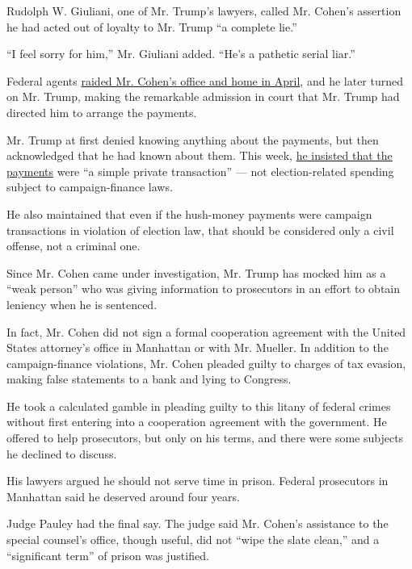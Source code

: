 Rudolph W. Giuliani, one of Mr. Trump's lawyers, called Mr. Cohen's
assertion he had acted out of loyalty to Mr. Trump ``a complete lie.''

``I feel sorry for him,'' Mr. Giuliani added. ``He's a pathetic serial
liar.''

Federal agents
\href{https://www.nytimes.com/2018/04/09/us/politics/fbi-raids-office-of-trumps-longtime-lawyer-michael-cohen.html}{raided
Mr. Cohen's office and home in April}, and he later turned on Mr. Trump,
making the remarkable admission in court that Mr. Trump had directed him
to arrange the payments.

Mr. Trump at first denied knowing anything about the payments, but then
acknowledged that he had known about them. This week,
\href{https://www.nytimes.com/2018/12/10/us/politics/trump-campaign-finance-crimes-defense.html}{he
insisted that the payments} were ``a simple private transaction'' ---
not election-related spending subject to campaign-finance laws.

He also maintained that even if the hush-money payments were campaign
transactions in violation of election law, that should be considered
only a civil offense, not a criminal one.

Since Mr. Cohen came under investigation, Mr. Trump has mocked him as a
``weak person'' who was giving information to prosecutors in an effort
to obtain leniency when he is sentenced.

In fact, Mr. Cohen did not sign a formal cooperation agreement with the
United States attorney's office in Manhattan or with Mr. Mueller. In
addition to the campaign-finance violations, Mr. Cohen pleaded guilty to
charges of tax evasion, making false statements to a bank and lying to
Congress.

He took a calculated gamble in pleading guilty to this litany of federal
crimes without first entering into a cooperation agreement with the
government. He offered to help prosecutors, but only on his terms, and
there were some subjects he declined to discuss.

His lawyers argued he should not serve time in prison. Federal
prosecutors in Manhattan said he deserved around four years.

Judge Pauley had the final say. The judge said Mr. Cohen's assistance to
the special counsel's office, though useful, did not ``wipe the slate
clean,'' and a ``significant term'' of prison was justified.

\href{https://www.nytimes.com/interactive/2018/08/21/us/mueller-trump-charges.html}{}

